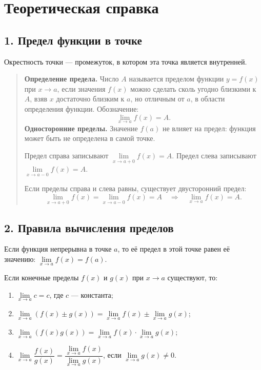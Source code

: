 \section*{Теоретическая справка}

\subsection*{1. Предел функции в точке}
Окрестность точки --- промежуток, в котором эта точка является внутренней.

\begin{quote}
\textbf{Определение предела.} Число $A$ называется пределом функции $y=f(x)$ при $x\to a$, если значения $f(x)$ можно сделать сколь угодно близкими к $A$, взяв $x$ достаточно близким к $a$, но отличным от $a$, в области определения функции. Обозначение:
\[
  \lim\limits_{x\to a} f(x)=A.
\]
\textbf{Односторонние пределы.} Значение $f(a)$ не влияет на предел: функция может быть не определена в самой точке.

Предел справа записывают $\lim\limits_{x\to a+0}f(x)=A$.
Предел слева записывают $\lim\limits_{x\to a-0}f(x)=A$.

Если пределы справа и слева равны, существует двусторонний предел:
\[
\lim\limits_{x\to a+0}f(x)=\lim\limits_{x\to a-0}f(x)=A
\quad\Longrightarrow\quad
\lim\limits_{x\to a}f(x)=A.
\]
\end{quote}

\subsection*{2. Правила вычисления пределов}
Если функция непрерывна в точке $a$, то её предел в этой точке равен её значению: $\lim\limits_{x\to a}f(x)=f(a)$.

Если конечные пределы $f(x)$ и $g(x)$ при $x\to a$ существуют, то:
\begin{enumerate}
  \item $\lim\limits_{x\to a}c=c$, где $c$ --- константа;
  \item $\lim\limits_{x\to a}(f(x)\pm g(x))=\lim\limits_{x\to a}f(x)\pm\lim\limits_{x\to a}g(x)$;
  \item $\lim\limits_{x\to a}(f(x)g(x))=\lim\limits_{x\to a}f(x)\cdot\lim\limits_{x\to a}g(x)$;
  \item $\lim\limits_{x\to a}\dfrac{f(x)}{g(x)}=\dfrac{\lim\limits_{x\to a}f(x)}{\lim\limits_{x\to a}g(x)}$, если $\lim\limits_{x\to a}g(x)\ne0$.
\end{enumerate}


